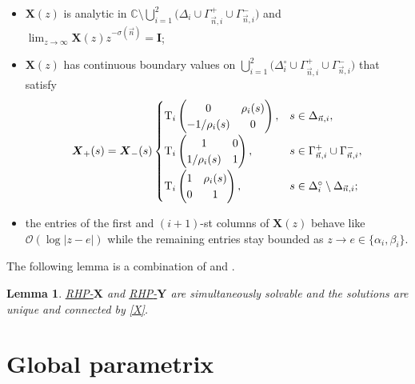 \documentclass[10pt,a4paper]{amsart}
\numberwithin{equation}{section}
\newtheorem{Lemma}[Theorem]{Lemma}
\newcommand{\C}		{\mathbb{C}}
\newcommand{\n}{{\vec n}}
\newcommand{\rhy} {\textnormal{RHP}-${\boldsymbol Y}$}
\newcommand{\rhx} {\textnormal{RHP}-${\boldsymbol X}$}
\begin{document}
\begin{itemize}\itemsep=0pt
\item[(a)] $\boldsymbol X(z)$ is analytic in $\C\setminus\bigcup_{i=1}^2\bigl(\Delta_i\cup\Gamma_{\n,i}^+\cup\Gamma_{\n,i}^-\bigr)$ and $ \lim_{z\to\infty} {\boldsymbol X}(z)z^{-\sigma(\n)} = {\boldsymbol I}$;
\item[(b)] $\boldsymbol X(z)$ has continuous boundary values on $\bigcup_{i=1}^2\bigl(\Delta_i^\circ\cup\Gamma_{\n,i}^+\cup\Gamma_{\n,i}^-\bigr)$ that satisfy
\[
{\boldsymbol X}_+(s)={\boldsymbol X}_-(s)
\begin{cases}
\displaystyle \mathrm{T}_i \begin{pmatrix} 0 & \rho_i(s) \\ -1/\rho_i(s) & 0 \end{pmatrix}, & s\in \Delta_{\n,i}, \vspace{0.5mm}\\
\displaystyle \mathrm{T}_i \begin{pmatrix} 1 & 0 \\ 1/\rho_i(s) & 1 \end{pmatrix}, & s\in \Gamma_{\n,i}^+\cup\Gamma_{\n,i}^-, \vspace{0.5mm}\\
\displaystyle \mathrm{T}_i \begin{pmatrix} 1 & \rho_i(s) \\ 0 & 1 \end{pmatrix}, & s\in \Delta_i^\circ\setminus\Delta_{\n,i};
\end{cases}
\]
\item[(c)] the entries of the first and $(i+1)$-st columns of $\boldsymbol X(z)$ behave like $\mathcal{O}\left(\log|z-e|\right)$ while the remaining entries stay bounded as $z\to e\in\{\alpha_i,\beta_i\}$.
\end{itemize}

The following lemma is a combination of \cite[Lemma~8.1]{Ya16} and \cite[Lemma~6.4]{BYa10}.

\begin{Lemma}
\label{rhx}
\hyperref[rhx]{\rhx} and \hyperref[rhy]{\rhy} are simultaneously solvable and the solutions are unique and connected by \eqref{X}.
\end{Lemma}


\section{Global parametrix}
\end{document}
